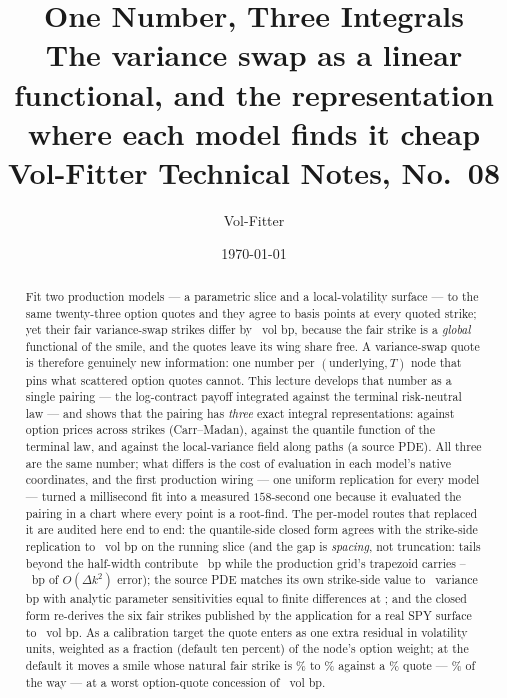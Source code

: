 \documentclass[11pt]{article}
\title{\textbf{One Number, Three Integrals}\\[2pt]
\large The variance swap as a linear functional, and the representation
where each model finds it cheap\\[2pt]
\normalsize Vol-Fitter Technical Notes, No.~08}
\author{Vol-Fitter}
\date{\today}
\begin{document}
\maketitle



\begin{abstract}
Fit two production models --- a parametric slice and a local-volatility
surface --- to the same twenty-three option quotes and they agree to basis
points at every quoted strike; yet their fair variance-swap strikes differ
by \vsrlvgapbp\ vol bp, because the fair strike is a \emph{global}
functional of the smile, and the quotes leave its wing share free.  A
variance-swap quote is therefore genuinely new information: one number per
$(\text{underlying},T)$ node that pins what scattered option quotes cannot.
This lecture develops that number as a single pairing --- the log-contract
payoff integrated against the terminal risk-neutral law --- and shows that
the pairing has \emph{three} exact integral representations: against option
prices across strikes (Carr--Madan), against the quantile function of the
terminal law, and against the local-variance field along paths
(a source PDE).  All three are the same number; what differs is the cost of
evaluation in each model's native coordinates, and the first production
wiring --- one uniform replication for every model --- turned a millisecond
fit into a measured $158$-second one because it evaluated the pairing in a
chart where every point is a root-find.  The per-model routes that replaced
it are audited here end to end: the quantile-side closed form agrees with
the strike-side replication to \vsragreebp\ vol bp on the running slice
(and the gap is \emph{spacing}, not truncation: tails beyond the
half-width contribute \vsrtruncsixbp\ bp while the production grid's
trapezoid carries \vsrreplfinebp--\vsragreebp\ bp of $O(\Delta k^2)$
error); the source PDE matches its own strike-side value to
\vsrlvagreebp\ variance bp with analytic parameter sensitivities equal to
finite differences at \vsrsensabs; and the closed form re-derives the six
fair strikes published by the application for a real SPY surface to
\vsrheroagreebp\ vol bp.  As a calibration target the quote enters as one
extra residual in volatility units, weighted as a fraction (default ten
percent) of the node's option weight; at the default it moves a smile whose
natural fair strike is \vsrclosed\% to \vsrpulled\% against a
\vsrtarget\% quote --- \vsrpullsharepct\% of the way --- at a worst
option-quote concession of \vsrpullfitbp\ vol bp.
\end{abstract}
\end{document}
